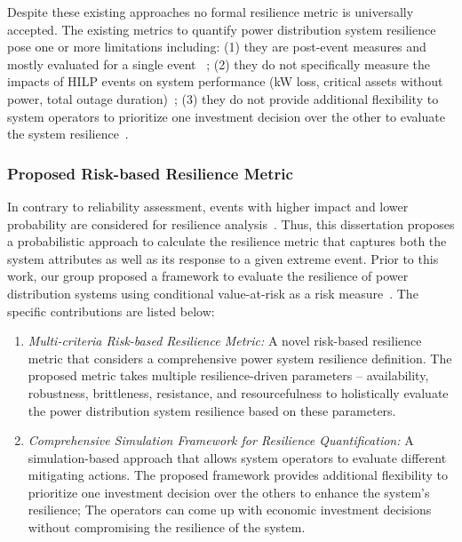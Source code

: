\documentclass[hidelinks, 12pt]{article}
\begin{document}
Despite these existing approaches no formal resilience metric is universally accepted. The existing metrics to quantify power distribution system resilience pose one or more limitations including: (1) they are post-event measures and mostly evaluated for a single event~\cite{gao2016resilience, poudel2018critical, wen2020resilience} ; (2) they do not specifically measure the impacts of HILP events on system performance (kW loss, critical assets without power, total outage duration)~\cite{7728107, chanda2016defining}; (3) they do not provide additional flexibility to system operators to prioritize one investment decision over the other to evaluate the system resilience~\cite{8767980}. 

\subsubsection{Proposed Risk-based Resilience Metric}
In contrary to reliability assessment, events with higher impact and lower probability are considered for resilience analysis~\cite{panteli2015grid}. Thus, this dissertation proposes a probabilistic approach to calculate the resilience metric that captures both the system attributes as well as its response to a given extreme event. Prior to this work, our group proposed a framework to evaluate the resilience of power distribution systems using conditional value-at-risk as a risk measure~\cite{poudel2019risk}. The specific contributions are listed below:

\begin{enumerate}
    \item \textit{Multi-criteria Risk-based Resilience Metric:} A novel risk-based resilience metric that considers a comprehensive power system resilience definition. The proposed metric takes multiple resilience-driven parameters -- availability, robustness, brittleness, resistance, and resourcefulness to holistically evaluate the power distribution system resilience based on these parameters. 
    \item \textit{Comprehensive Simulation Framework for Resilience Quantification:} A simulation-based approach that allows system operators to evaluate different mitigating actions. The proposed framework provides additional flexibility to prioritize one investment decision over the others to enhance the system's resilience; The operators can come up with economic investment decisions without compromising the resilience of the system.   
\end{enumerate}
\end{document}
